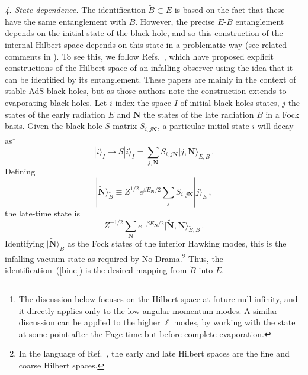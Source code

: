 \documentclass[12pt]{article}
\newcommand{\be}{\begin{equation}}
\newcommand{\ee}{\end{equation}}
\begin{document}
{\it 4. State dependence.} The identification $\tilde B \subset E$ is based on the fact that these have the same entanglement with $B$.  However, the precise $E$-$B$ entanglement depends on the initial state of the black hole, and so this construction of the internal Hilbert space depends on this state in a problematic way {(see related comments in \cite{Bousso:2012as})}.  To see this, we follow Refs.~\cite{Papadodimas:2012aq,Verlinde:2012cy}, which have proposed explicit constructions of the Hilbert space of an infalling observer using the idea that it can be identified by its entanglement. These papers are mainly in the context of stable AdS black holes, but as those authors note the construction extends to evaporating black holes. Let $i$ index the space $I$ of initial black holes states, $j$ the states of the early radiation $E$ and $\bm N$ the states of the late radiation $B$ in a Fock basis.  Given the black hole $S$-matrix $S_{i,j\bm N}$, a particular initial state $i$ will decay as\footnote{{The discussion below focuses on the Hilbert space at future null infinity, and it directly applies only to the low angular momentum modes. A similar discussion can be applied to the higher $\ell$ modes, by working with the state at some point after the Page time but before complete evaporation.}}
\be
| i \rangle_I \to S|i\rangle_I = \sum_{j,\bm N} S_{i,j\bm N}| j, {\bm N}\rangle_{E,B}  \,.
\ee
Defining
\be
|\tilde {\bm N} \rangle_{\tilde B} \equiv {Z^{1/2}} e^{\beta E_{\bm N}/2}  \sum_{j} S_{i,j\bm N}| j \rangle_E \label{bine}\,,
\ee
the late-time state is
\be
{Z^{-1/2}}\sum_{\bm N} e^{-\beta E_{\bm N}/2} |\tilde {\bm N}, {\bm N} \rangle_{\tilde B, B} \,.
\ee
Identifying $|\tilde {\bm N} \rangle_{\tilde B}$ as the Fock states of the interior Hawking modes, this is the infalling vacuum state as required by No Drama.\footnote{{In the language of Ref.~\cite{Papadodimas:2012aq}, the early and late Hilbert spaces are the fine and coarse Hilbert spaces.}}  Thus, the identification~(\ref{bine}) is the desired mapping from $\tilde B$ into $E$.
\end{document}
